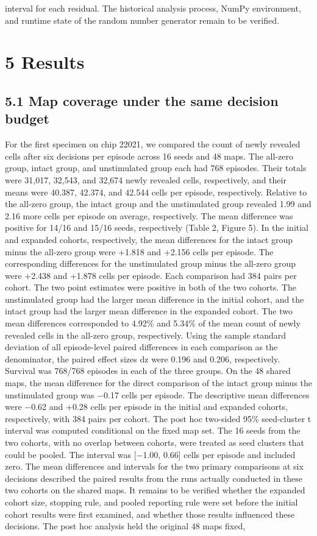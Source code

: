 \documentclass{article}
\begin{document}
interval for each residual. The historical analysis process, NumPy environment, and runtime state of the random number generator remain to be verified.


\section*{5 Results}


\subsection*{5.1 Map coverage under the same decision budget}


For the first specimen on chip 22021, we compared the count of newly revealed cells after six decisions per episode across 16 seeds and 48 maps. The all-zero group, intact group, and unstimulated group each had 768 episodes. Their totals were 31,017, 32,543, and 32,674 newly revealed cells, respectively, and their means were 40.387, 42.374, and 42.544 cells per episode, respectively. Relative to the all-zero group, the intact group and the unstimulated group revealed 1.99 and 2.16 more cells per episode on average, respectively. The mean difference was positive for 14/16 and 15/16 seeds, respectively (Table 2, Figure 5). In the initial and expanded cohorts, respectively, the mean differences for the intact group minus the all-zero group were +1.818 and +2.156 cells per episode. The corresponding differences for the unstimulated group minus the all-zero group were +2.438 and +1.878 cells per episode. Each comparison had 384 pairs per cohort. The two point estimates were positive in both of the two cohorts. The unstimulated group had the larger mean difference in the initial cohort, and the intact group had the larger mean difference in the expanded cohort. The two mean differences corresponded to 4.92\% and 5.34\% of the mean count of newly revealed cells in the all-zero group, respectively. Using the sample standard deviation of all episode-level paired differences in each comparison as the denominator, the paired effect sizes dz were 0.196 and 0.206, respectively. Survival was 768/768 episodes in each of the three groups. On the 48 shared maps, the mean difference for the direct comparison of the intact group minus the unstimulated group was \ensuremath{-}0.17 cells per episode. The descriptive mean differences were \ensuremath{-}0.62 and +0.28 cells per episode in the initial and expanded cohorts, respectively, with 384 pairs per cohort. The post hoc two-sided 95\% seed-cluster t interval was computed conditional on the fixed map set. The 16 seeds from the two cohorts, with no overlap between cohorts, were treated as seed clusters that could be pooled. The interval was [\ensuremath{-}1.00, 0.66] cells per episode and included zero. The mean differences and intervals for the two primary comparisons at six decisions described the paired results from the runs actually conducted in these two cohorts on the shared maps. It remains to be verified whether the expanded cohort size, stopping rule, and pooled reporting rule were set before the initial cohort results were first examined, and whether those results influenced these decisions. The post hoc analysis held the original 48 maps fixed, 
\end{document}
